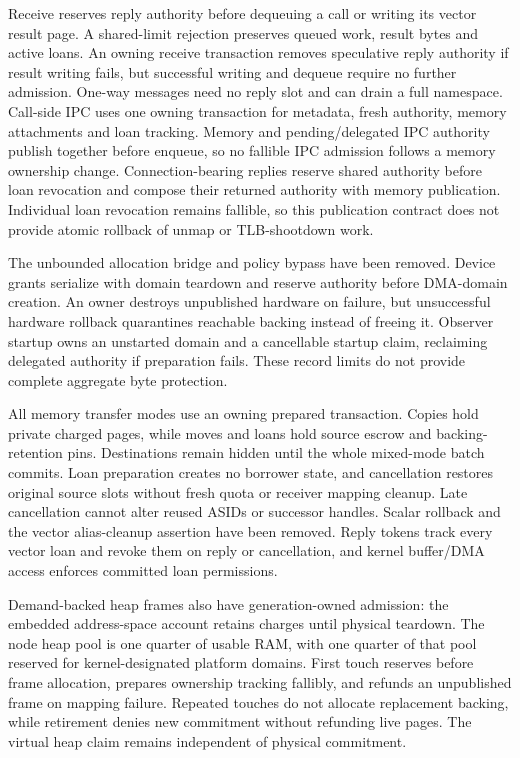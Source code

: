 Receive reserves reply authority before dequeuing a call or writing its vector
result page. A shared-limit rejection preserves queued work, result bytes and
active loans. An owning receive transaction removes speculative reply authority
if result writing fails, but successful writing and dequeue require no further
admission. One-way messages need no reply slot and can drain a full namespace.
Call-side IPC uses one owning transaction for metadata, fresh authority, memory
attachments and loan tracking. Memory and pending/delegated IPC authority
publish together before enqueue, so no fallible IPC admission follows a memory
ownership change. Connection-bearing replies reserve shared authority before
loan revocation and compose their returned authority with memory publication.
Individual loan revocation remains fallible, so this publication contract does
not provide atomic rollback of unmap or TLB-shootdown work.

The unbounded allocation bridge and policy bypass have been removed. Device
grants serialize with domain teardown and reserve authority before DMA-domain
creation. An owner destroys unpublished hardware on failure, but unsuccessful
hardware rollback quarantines reachable backing instead of freeing it.
Observer startup owns an unstarted domain and a cancellable startup claim,
reclaiming delegated authority if preparation fails. These record limits do
not provide complete aggregate byte protection.

All memory transfer modes use an owning prepared
transaction. Copies hold private charged pages, while moves and loans hold source
escrow and backing-retention pins. Destinations remain hidden until the whole
mixed-mode batch commits. Loan preparation creates no borrower state, and
cancellation restores original source slots without fresh quota or receiver
mapping cleanup. Late cancellation cannot alter reused ASIDs or successor
handles. Scalar rollback and the vector alias-cleanup assertion have been
removed. Reply tokens track every vector loan and revoke them on reply or
cancellation, and kernel buffer/DMA access enforces committed loan permissions.

Demand-backed heap frames also have generation-owned admission: the embedded
address-space account retains charges until physical teardown. The node heap
pool is one quarter of usable RAM, with one quarter of that pool reserved for
kernel-designated platform domains. First touch reserves before frame
allocation, prepares ownership tracking fallibly, and refunds an unpublished
frame on mapping failure. Repeated touches do not allocate replacement backing, while
retirement denies new commitment without refunding live pages.
The virtual heap claim remains independent of physical commitment.

